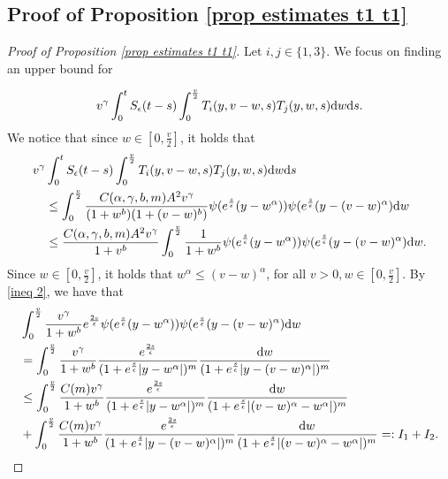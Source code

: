 \documentclass[11pt]{article}
\numberwithin{equation}{section}
\newcommand{\der}{\textup{d}}
\begin{document}
\subsection{Proof of Proposition \ref{prop estimates t1 t1}}
\begin{proof}[Proof of Proposition 
\ref{prop estimates t1 t1}] Let $i,j\in\{1,3\}$. We focus on finding an upper bound for 

\begin{align}\label{semigroup t1 t1}
    v^{\gamma}\int_{0}^{t}S_{\epsilon}(t-s)\int_{0}^{\frac{v}{2}} T_{i}(y,v-w,s)T_{j}(y,w,s)\der w\der s.
\end{align}
We notice that since $w\in[0,\frac{v}{2}]$, it holds that
\begin{align*}
   v^{\gamma}&\int_{0}^{t}S_{\epsilon}(t-s)\int_{0}^{\frac{v}{2}} T_{i}(y,v-w,s)T_{j}(y,w,s)\der w\der s\\
    &\leq \int_{0}^{\frac{v}{2}}\frac{C(\alpha,\gamma,b,m) A^{2}v^{\gamma}}{(1+w^{b})(1+(v-w)^{b})}\psi(e^{\frac{s}{\epsilon}}(y-w^{\alpha}))\psi(e^{\frac{s}{\epsilon}}(y-(v-w)^{\alpha})\der w\\
    &\leq \frac{C(\alpha,\gamma,b,m)  A^{2} v^{\gamma}}{1+v^{b}}\int_{0}^{\frac{v}{2}}\frac{1}{1+w^{b}}\psi(e^{\frac{s}{\epsilon}}(y-w^{\alpha}))\psi(e^{\frac{s}{\epsilon}}(y-(v-w)^{\alpha})\der w.
\end{align*}
Since $w\in[0,\frac{v}{2}]$, it holds that $w^{\alpha}\leq (v-w)^{\alpha}$, for all $v>0, w\in[0,\frac{v}{2}]$. By \eqref{ineq 2}, we have that
\begin{align}
&\int_{0}^{\frac{v}{2}}\frac{v^{\gamma}}{1+w^{b}}e^{\frac{2s}{\epsilon}}\psi(e^{\frac{s}{\epsilon}}(y-w^{\alpha}))\psi(e^{\frac{s}{\epsilon}}(y-(v-w)^{\alpha})\der w\nonumber\\
&= \int_{0}^{\frac{v}{2}}\frac{v^{\gamma}}{1+w^{b}}\frac{e^{\frac{2s}{\epsilon}}}{(1+e^{\frac{s}{\epsilon}}|y-w^{\alpha}|)^{m}}\frac{\der w}{(1+e^{\frac{s}{\epsilon}}|y-(v-w)^{\alpha}|)^{m}}\nonumber\\
&\leq \int_{0}^{\frac{v}{2}}\frac{C(m)v^{\gamma}}{1+w^{b}}\frac{e^{\frac{2s}{\epsilon}}}{(1+e^{\frac{s}{\epsilon}}|y-w^{\alpha}|)^{m}}\frac{\der w}{(1+e^{\frac{s}{\epsilon}}|(v-w)^{\alpha}-w^{\alpha}|)^{m}}\nonumber\\
&+\int_{0}^{\frac{v}{2}}\frac{C(m)v^{\gamma}}{1+w^{b}}\frac{e^{\frac{2s}{\epsilon}}}{(1+e^{\frac{s}{\epsilon}}|y-(v-w)^{\alpha}|)^{m}}\frac{\der w}{(1+e^{\frac{s}{\epsilon}}|(v-w)^{\alpha}-w^{\alpha}|)^{m}}=:I_{1}+I_{2}.\label{first step y greater v alpha}
\end{align}



\end{proof}
\end{document}
